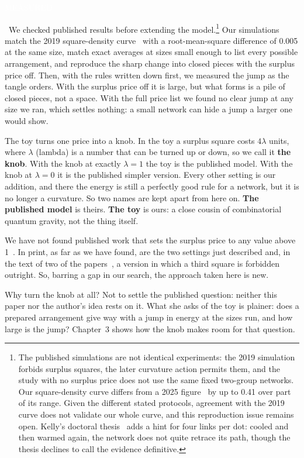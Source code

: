 \documentclass[11pt,letterpaper]{article}
\newcommand{\sub}[1]{\par\medskip{\color{ink}\large\bfseries #1}\par}
\newcommand{\tagbox}[2]{{\sffamily\scriptsize\colorbox{#1}{\textcolor{white}{\strut #2}}}}
\newcommand{\Meas}{\tagbox{kMeas}{MEASURED}}
\begin{document}
\Meas\ We checked published results before extending the model.\footnote{The published simulations are
not identical experiments: the 2019 simulation forbids surplus squares, the later curvature action
permits them, and the study with no surplus price does not use the same fixed two-group networks. Our
square-density curve differs from a 2025 figure~\cite{T25} by up to 0.41 over part of its range. Given
the different stated protocols, agreement with the 2019 curve does not validate our whole curve, and
this reproduction issue remains open. Kelly's doctoral thesis~\cite{Kelly22} adds a hint for four
links per dot: cooled and then warmed again, the network does not quite retrace its path, though the
thesis declines to call the evidence definitive.} Our simulations match the 2019 square-density curve~\cite{KTB19} with a root-mean-square
difference of 0.005 at the same size, match exact averages at sizes small enough to list every
possible arrangement, and reproduce the sharp change into closed pieces with the surplus price off.
Then, with the rules written down first, we measured the jump as the tangle orders. With the
surplus price off it is large, but what forms is a pile of closed pieces, not a space. With the full
price list we found no clear jump at any size we ran, which settles nothing: a small network can hide
a jump a larger one would show.

\sub{The one thing we change}
The toy turns one price into a knob. In the toy a surplus square costs $4\lambda$ units, where
$\lambda$ (lambda) is a number that can be turned up or down, so we call it \textbf{the knob}. With
the knob at exactly $\lambda = 1$ the toy is the published model. With the knob at $\lambda = 0$ it is
the published simpler version. Every other setting is our addition, and there the energy is still a
perfectly good rule for a network, but it is no longer a curvature. So two names are kept apart from
here on. \textbf{The published model} is theirs. \textbf{The toy} is ours: a close cousin of
combinatorial quantum gravity, not the thing itself.

We have not found published work that sets the surplus price to any value above 1~\cite{search}. In
print, as far as we have found, are the two settings just described and, in the text of two of the
papers~\cite{KTB19,KT19}, a version in which a third square is forbidden outright. So, barring a gap in
our search, the approach taken here is new.

Why turn the knob at all? Not to settle the published question: neither this paper nor the author's
idea rests on it. What she asks of the toy is plainer: does a prepared arrangement give way with a jump in energy at
the sizes run, and how large is the jump? Chapter~3 shows how the knob makes room for that question.
\end{document}
